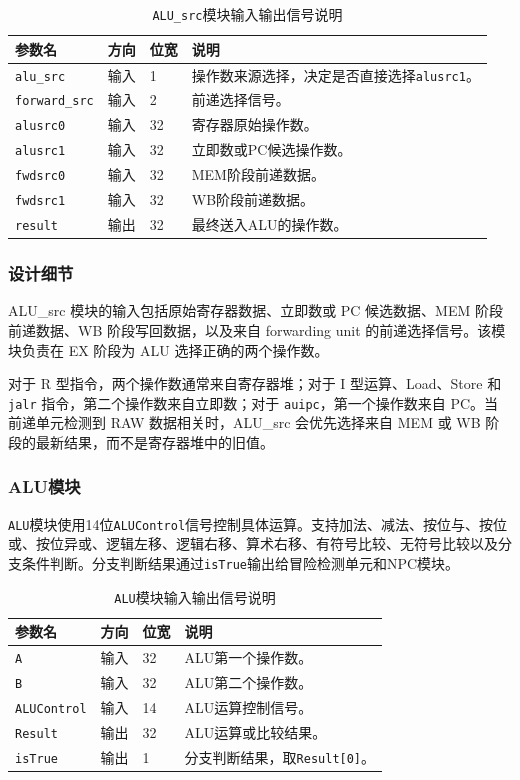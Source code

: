 \documentclass[UTF8,a4paper,12pt]{ctexart}
\newcommand{\code}[1]{\texttt{#1}}
\begin{document}
\begin{table}[H]
\centering
\caption{\code{ALU\_src}模块输入输出信号说明}
\footnotesize
\renewcommand{\arraystretch}{1.15}
\begin{tabularx}{\textwidth}{p{3.2cm}p{1.5cm}p{2.1cm}X}
\toprule
参数名 & 方向 & 位宽 & 说明 \\
\midrule
\code{alu\_src} & 输入 & 1 & 操作数来源选择，决定是否直接选择\code{alusrc1}。 \\
\code{forward\_src} & 输入 & 2 & 前递选择信号。 \\
\code{alusrc0} & 输入 & 32 & 寄存器原始操作数。 \\
\code{alusrc1} & 输入 & 32 & 立即数或PC候选操作数。 \\
\code{fwdsrc0} & 输入 & 32 & MEM阶段前递数据。 \\
\code{fwdsrc1} & 输入 & 32 & WB阶段前递数据。 \\
\code{result} & 输出 & 32 & 最终送入ALU的操作数。 \\
\bottomrule
\end{tabularx}
\end{table}

\subsubsection*{设计细节}

ALU\_src 模块的输入包括原始寄存器数据、立即数或 PC 候选数据、MEM 阶段前递数据、WB 阶段写回数据，以及来自 forwarding unit 的前递选择信号。该模块负责在 EX 阶段为 ALU 选择正确的两个操作数。

对于 R 型指令，两个操作数通常来自寄存器堆；对于 I 型运算、Load、Store 和 \code{jalr} 指令，第二个操作数来自立即数；对于 \code{auipc}，第一个操作数来自 PC。当前递单元检测到 RAW 数据相关时，ALU\_src 会优先选择来自 MEM 或 WB 阶段的最新结果，而不是寄存器堆中的旧值。

\subsubsection{ALU模块}

\code{ALU}模块使用14位\code{ALUControl}信号控制具体运算。支持加法、减法、按位与、按位或、按位异或、逻辑左移、逻辑右移、算术右移、有符号比较、无符号比较以及分支条件判断。分支判断结果通过\code{isTrue}输出给冒险检测单元和NPC模块。

\begin{table}[H]
\centering
\caption{\code{ALU}模块输入输出信号说明}
\footnotesize
\renewcommand{\arraystretch}{1.15}
\begin{tabularx}{\textwidth}{p{3.2cm}p{1.5cm}p{2.1cm}X}
\toprule
参数名 & 方向 & 位宽 & 说明 \\
\midrule
\code{A} & 输入 & 32 & ALU第一个操作数。 \\
\code{B} & 输入 & 32 & ALU第二个操作数。 \\
\code{ALUControl} & 输入 & 14 & ALU运算控制信号。 \\
\code{Result} & 输出 & 32 & ALU运算或比较结果。 \\
\code{isTrue} & 输出 & 1 & 分支判断结果，取\code{Result[0]}。 \\
\bottomrule
\end{tabularx}
\end{table}
\end{document}
